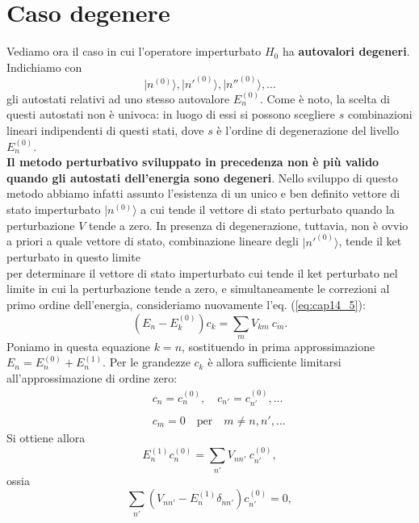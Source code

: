 \documentclass[a4paper,12pt,oneside]{book}
\begin{document}
\section{Caso degenere}
Vediamo ora il caso in cui l'operatore imperturbato $H_0$ ha \textbf{autovalori degeneri}. Indichiamo con
\begin{equation}
\vert n^{(0)} \rangle, \vert n'^{(0)} \rangle, \vert n''^{(0)} \rangle, \dots
\end{equation}
gli autostati relativi ad uno stesso autovalore $E_n ^{(0)}$. Come è noto, la scelta di questi autostati non è univoca: in luogo di essi si possono scegliere $s$ combinazioni lineari indipendenti di questi stati, dove $s$ è l'ordine di degenerazione del livello $E_n ^{(0)}$.\\
\textbf{Il metodo perturbativo sviluppato in precedenza non è più valido quando gli autostati dell'energia sono degeneri}. Nello sviluppo di questo metodo abbiamo infatti assunto l'esistenza di un unico e ben definito vettore di stato imperturbato $\vert n ^{(0)}\rangle$ a cui tende il vettore di stato perturbato quando la perturbazione $V$ tende a zero. In presenza di degenerazione, tuttavia, non è ovvio a priori a quale vettore di stato, combinazione lineare degli $\vert n'^{(0)}\rangle$, tende il ket perturbato in questo limite\\
per determinare il vettore di stato imperturbato cui tende il ket perturbato nel limite in cui la perturbazione tende a zero, e simultaneamente le correzioni al primo ordine dell'energia, consideriamo nuovamente l'eq. (\ref{eq:cap14_5}):
\begin{equation}
(E_n - E_k ^{(0)}) c_k = \sum _m V_{km}\ c_m.
\end{equation}
Poniamo in questa equazione $k=n$, sostituendo in prima approssimazione $E_n = E_n ^{(0)}+E_n ^{(1)}$. Per le grandezze $c_k$ è allora sufficiente limitarsi all'approssimazione di ordine zero:
\begin{eqnarray}
& &c_n = c_n ^{(0)}, \quad c_{n'} = c_{n'} ^{(0)},\dots \nonumber \\
\\
& &c_m =0 \quad \textrm{per}\quad m\neq n, n', \dots \nonumber
\end{eqnarray}
Si ottiene allora
\begin{equation}
E_n ^{(1)}c_n ^{(0)}= \sum _{n'} V_{n n'}\ c_{n'} ^{(0)},
\end{equation}
ossia
\begin{equation}
\sum _{n'} \left( V_{n n'}- E_n ^{(1)}\delta _{nn'} \right) c_{n'} ^{(0)}=0,
\label{eq:cap14_13}
\end{equation}
\end{document}
